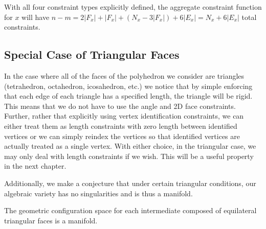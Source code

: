 With all four constraint types explicitly defined, the aggregate constraint function for $x$ will have $n-m = 2|F_x|+ |F_x| + (N_x - 3|F_x|) + 6|E_x| = N_x + 6|E_x|$ total constraints. 



\subsection{Special Case of Triangular Faces}

In the case where all of the faces of the polyhedron we consider are triangles (tetrahedron, octahedron, icosahedron, etc.) we notice that by simple enforcing that each edge of each triangle has a specified length, the triangle will be rigid. This means that we do not have to use the angle and 2D face constraints. Further, rather that explicitly using vertex identification constraints, we can either treat them as length constraints with zero length between identified vertices or we can simply reindex the vertices so that identified vertices are actually treated as a single vertex. With either choice, in the triangular case, we may only deal with length constraints if we wish. This will be a useful property in the next chapter. 

Additionally, we make a conjecture that under certain triangular conditions, our algebraic variety has no singularities and is thus a manifold.
\begin{mycon}
\label{con:TriMan}
The geometric configuration space for each intermediate composed of equilateral triangular faces is a manifold.
\end{mycon}

